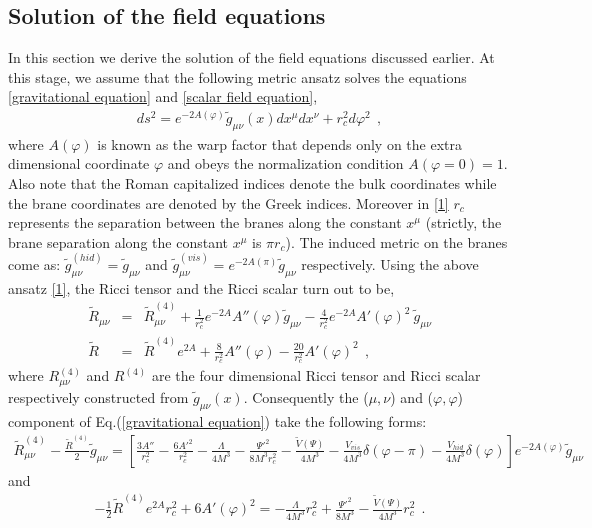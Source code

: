 \documentclass{article}
\begin{document}
\subsection{Solution of the field equations}
\label{S2-1}
In this section we derive the solution of the field equations discussed earlier.
At this stage, we assume that the following metric ansatz solves the equations \ref{gravitational equation} and \ref{scalar field equation},
\begin{eqnarray}
 ds^2 = e^{-2A(\varphi)}\tilde{g}_{\mu\nu}(x)dx^{\mu}dx^{\nu} + r_c^2d\varphi^2~~,
 \label{1}
\end{eqnarray}
where $A(\varphi)$ is known as the warp factor that depends only on the extra dimensional coordinate $\varphi$ 
and obeys the normalization condition $A(\varphi = 0) = 1$. Also note that the Roman capitalized indices denote the bulk coordinates while the brane coordinates are denoted by the Greek indices.  
Moreover in \ref{1} $r_c$ represents the separation between the branes along the constant $x^{\mu}$ (strictly, the 
brane separation along the constant $x^{\mu}$ is $ \pi r_c$). The induced metric on the branes come as: 
$\tilde{g}_{\mu\nu}^{(hid)} = \tilde{g}_{\mu\nu}$ and $\tilde{g}_{\mu\nu}^{(vis)} = e^{-2A(\pi)}\tilde{g}_{\mu\nu}$ respectively. 
Using the above ansatz \ref{1}, the Ricci tensor and the Ricci scalar turn out to be,
\begin{eqnarray}
 \tilde{R}_{\mu\nu}&=&\tilde{R}_{\mu\nu}^{(4)} + \frac{1}{r_c^2}e^{-2A}A''(\varphi)\tilde{g}_{\mu\nu} - \frac{4}{r_c^2}e^{-2A}A'(\varphi)^2~\tilde{g}_{\mu\nu}\label{1-a}\\
 \tilde{R}&=&\tilde{R}^{(4)}e^{2A} + \frac{8}{r_c^2}A''(\varphi) - \frac{20}{r_c^2}A'(\varphi)^2~~,
 \label{1-b}
\end{eqnarray}
where $R_{\mu\nu}^{(4)}$ and $R^{(4)}$ are the four dimensional Ricci tensor and Ricci scalar respectively constructed from $\tilde{g}_{\mu\nu}(x)$. 
Consequently the ($\mu,\nu$) and ($\varphi,\varphi$) component of Eq.(\ref{gravitational equation}) take the following forms:
\begin{eqnarray}
 \tilde{R}_{\mu\nu}^{(4)} - \frac{\tilde{R}^{(4)}}{2}\tilde{g}_{\mu\nu} = \left[\frac{3A''}{r_c^2} - \frac{6A'^2}{r_c^2} - \frac{\Lambda}{4M^3} 
 - \frac{\Psi'^2}{8M^3r_c^2} - \frac{\tilde{V}(\Psi)}{4M^3} - \frac{V_{vis}}{4M^3} \delta(\varphi-\pi) - \frac{V_{hid}}{4M^3} \delta(\varphi) \right]e^{-2A(\varphi)}\tilde{g}_{\mu\nu}
 \label{gr eqn 1}
\end{eqnarray}
and
\begin{eqnarray}
 -\frac{1}{2}\tilde{R}^{(4)}e^{2A}r_c^2 + 6A'(\varphi)^2 = - \frac{\Lambda}{4M^3}r_c^2 + \frac{\Psi'^2}{8M^3} - \frac{\tilde{V}(\Psi)}{4M^3}r_c^2~~.
 \label{gr eqn 2}
\end{eqnarray}
\end{document}
